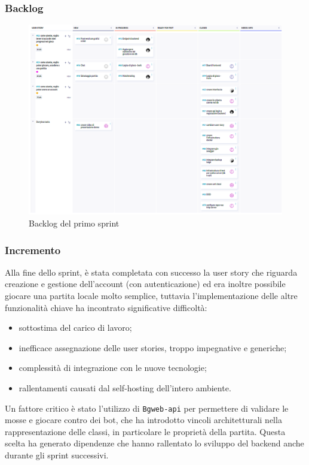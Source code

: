 \documentclass{article}
\begin{document}
\subsubsection{Backlog}
\begin{figure}[H]
    \centering
    \includegraphics[width=1\textwidth]{backlog1}
    \caption{Backlog del primo sprint}
    \label{fig:backlog-s1}
\end{figure}

\subsubsection{Incremento}
Alla fine dello sprint, è stata completata con successo la user story che riguarda creazione e gestione dell'account 
(con autenticazione) ed era inoltre possibile giocare una partita locale molto semplice, tuttavia l'implementazione delle 
altre funzionalità chiave ha incontrato significative difficoltà:
\begin{itemize}
    \item sottostima del carico di lavoro;
    \item inefficace assegnazione delle user stories, troppo impegnative e generiche;
    \item complessità di integrazione con le nuove tecnologie;
    \item rallentamenti causati dal self-hosting dell'intero ambiente.
\end{itemize}

Un fattore critico è stato l'utilizzo di \texttt{Bgweb-api} per permettere di validare le mosse e giocare contro dei bot, 
che ha introdotto vincoli architetturali nella rappresentazione delle classi, in particolare le proprietà della partita. 
Questa scelta ha generato dipendenze che hanno rallentato lo sviluppo del backend anche durante gli sprint successivi.
\end{document}
